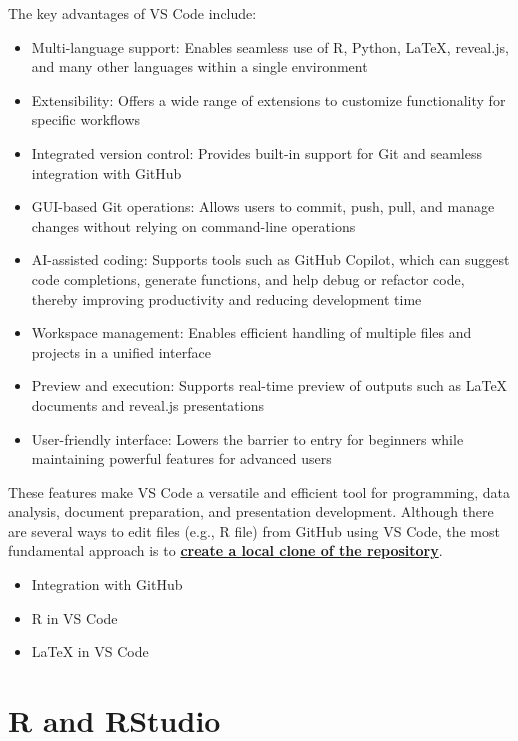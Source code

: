 \documentclass[11pt]{article}
\begin{document}
The key advantages of VS Code include:
\begin{itemize}
\item Multi-language support: Enables seamless use of R, Python, LaTeX, reveal.js, and many other languages within a single environment
\item Extensibility: Offers a wide range of extensions to customize functionality for specific workflows
\item Integrated version control: Provides built-in support for Git and seamless integration with GitHub
\item GUI-based Git operations: Allows users to commit, push, pull, and manage changes without relying on command-line operations
\item AI-assisted coding: Supports tools such as GitHub Copilot, which can suggest code completions, generate functions, and help debug or refactor code, thereby improving productivity and reducing development time
\item Workspace management: Enables efficient handling of multiple files and projects in a unified interface
\item Preview and execution: Supports real-time preview of outputs such as LaTeX documents and reveal.js presentations
\item User-friendly interface: Lowers the barrier to entry for beginners while maintaining powerful features for advanced users
\end{itemize}

These features make VS Code a versatile and efficient tool for 
programming, data analysis, document preparation, and presentation development.
Although there are several ways to edit files (e.g., R file) from GitHub using VS Code, 
the most fundamental approach is to \href{https://www.youtube.com/watch?v=N7UT6nvCqoI}{\textbf{create a local clone of the repository}}.

\begin{itemize}
\item Integration with GitHub
\item R in VS Code
\item LaTeX in VS Code
\end{itemize}


\section{R and RStudio}
\end{document}
